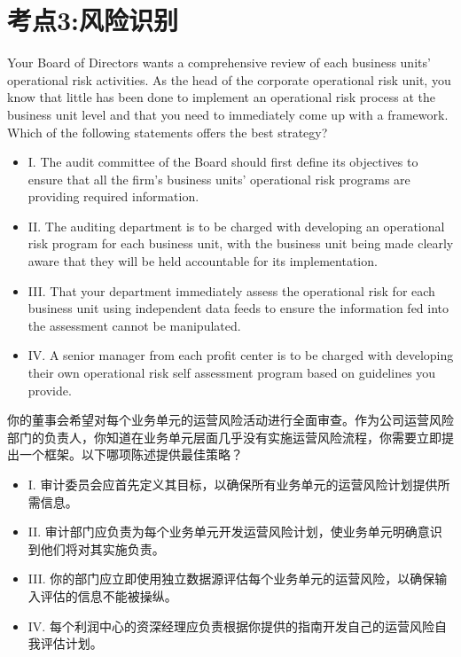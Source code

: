 \documentclass{article}
\newcounter{question} %
\begin{document}
\section{考点3:风险识别}
\setcounter{question}{0}
\begin{question}
    Your Board of Directors wants a comprehensive review of each business units' operational risk activities. As the head of the corporate operational risk unit, you know that little has been done to implement an operational risk process at the business unit level and that you need to immediately come up with a framework. Which of the following statements offers the best strategy?
    \begin{itemize}
        \item I. The audit committee of the Board should first define its objectives to ensure that all the firm's business units' operational risk programs are providing required information.
        \item II. The auditing department is to be charged with developing an operational risk program for each business unit, with the business unit being made clearly aware that they will be held accountable for its implementation.
        \item III. That your department immediately assess the operational risk for each business unit using independent data feeds to ensure the information fed into the assessment cannot be manipulated.
        \item IV. A senior manager from each profit center is to be charged with developing their own operational risk self assessment program based on guidelines you provide.
    \end{itemize}
    你的董事会希望对每个业务单元的运营风险活动进行全面审查。作为公司运营风险部门的负责人，你知道在业务单元层面几乎没有实施运营风险流程，你需要立即提出一个框架。以下哪项陈述提供最佳策略？
    \begin{itemize}
        \item I. 审计委员会应首先定义其目标，以确保所有业务单元的运营风险计划提供所需信息。
        \item II. 审计部门应负责为每个业务单元开发运营风险计划，使业务单元明确意识到他们将对其实施负责。
        \item III. 你的部门应立即使用独立数据源评估每个业务单元的运营风险，以确保输入评估的信息不能被操纵。
        \item IV. 每个利润中心的资深经理应负责根据你提供的指南开发自己的运营风险自我评估计划。
    \end{itemize}
\end{question}
\end{document}
